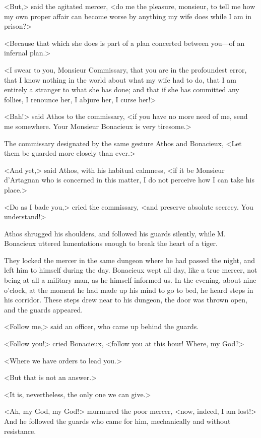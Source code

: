 <But,> said the agitated mercer, <do me the pleasure, monsieur, to tell me how my own proper affair can become worse by anything my wife does while I am in prison?> 

<Because that which she does is part of a plan concerted between you---of an infernal plan.> 

<I swear to you, Monsieur Commissary, that you are in the profoundest error, that I know nothing in the world about what my wife had to do, that I am entirely a stranger to what she has done; and that if she has committed any follies, I renounce her, I abjure her, I curse her!> 

<Bah!> said Athos to the commissary, <if you have no more need of me, send me somewhere. Your Monsieur Bonacieux is very tiresome.> 

The commissary designated by the same gesture Athos and Bonacieux, <Let them be guarded more closely than ever.> 

<And yet,> said Athos, with his habitual calmness, <if it be Monsieur d'Artagnan who is concerned in this matter, I do not perceive how I can take his place.> 

<Do as I bade you,> cried the commissary, <and preserve absolute secrecy. You understand!> 

Athos shrugged his shoulders, and followed his guards silently, while M. Bonacieux uttered lamentations enough to break the heart of a tiger. 

They locked the mercer in the same dungeon where he had passed the night, and left him to himself during the day. Bonacieux wept all day, like a true mercer, not being at all a military man, as he himself informed us. In the evening, about nine o'clock, at the moment he had made up his mind to go to bed, he heard steps in his corridor. These steps drew near to his dungeon, the door was thrown open, and the guards appeared. 

<Follow me,> said an officer, who came up behind the guards. 

<Follow you!> cried Bonacieux, <follow you at this hour! Where, my God?> 

<Where we have orders to lead you.> 

<But that is not an answer.> 

<It is, nevertheless, the only one we can give.> 

<Ah, my God, my God!> murmured the poor mercer, <now, indeed, I am lost!> And he followed the guards who came for him, mechanically and without resistance. 

